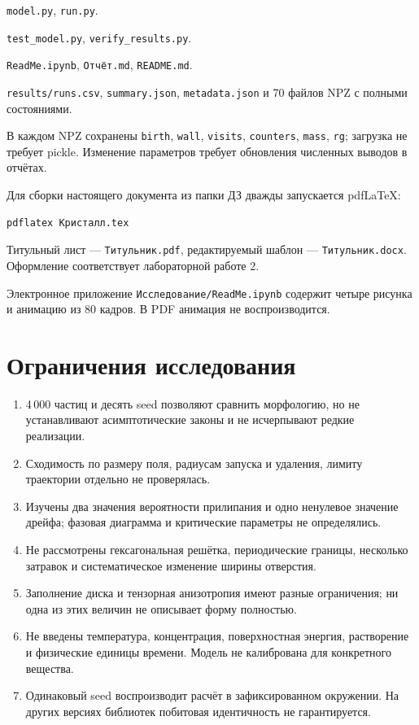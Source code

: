 \documentclass[12pt,a4paper]{article}
\begin{document}
\begin{description}[leftmargin=0pt]
\item[Модель и расчёты:] \texttt{model.py}, \texttt{run.py}.
\item[Проверки:] \texttt{test\_model.py}, \texttt{verify\_results.py}.
\item[Представление:] \texttt{ReadMe.ipynb}, \texttt{Отчёт.md}, \texttt{README.md}.
\item[Данные:] \texttt{results/runs.csv}, \texttt{summary.json}, \texttt{metadata.json}
и 70 файлов NPZ с полными состояниями.
\end{description}
В каждом NPZ сохранены \texttt{birth}, \texttt{wall}, \texttt{visits},
\texttt{counters}, \texttt{mass}, \texttt{rg}; загрузка не требует pickle.
Изменение параметров требует обновления численных выводов в отчётах.

Для сборки настоящего документа из папки ДЗ дважды запускается pdfLaTeX:
\begin{verbatim}
pdflatex Кристалл.tex
\end{verbatim}
Титульный лист --- \texttt{Титульник.pdf}, редактируемый шаблон ---
\texttt{Титульник.docx}. Оформление соответствует лабораторной работе 2.

Электронное приложение \nolinkurl{Исследование/ReadMe.ipynb} содержит четыре рисунка
и анимацию из 80 кадров. В PDF анимация не воспроизводится.

\section{Ограничения исследования}
\begin{enumerate}[nosep]
\item 4\,000 частиц и десять seed позволяют сравнить морфологию, но не устанавливают
асимптотические законы и не исчерпывают редкие реализации.
\item Сходимость по размеру поля, радиусам запуска и удаления, лимиту траектории
отдельно не проверялась.
\item Изучены два значения вероятности прилипания и одно ненулевое значение дрейфа;
фазовая диаграмма и критические параметры не определялись.
\item Не рассмотрены гексагональная решётка, периодические границы, несколько
затравок и систематическое изменение ширины отверстия.
\item Заполнение диска и тензорная анизотропия имеют разные ограничения;
ни одна из этих величин не описывает форму полностью.
\item Не введены температура, концентрация, поверхностная энергия, растворение
и физические единицы времени. Модель не калибрована для конкретного вещества.
\item Одинаковый seed воспроизводит расчёт в зафиксированном окружении.
На других версиях библиотек побитовая идентичность не гарантируется.
\end{enumerate}
\end{document}
